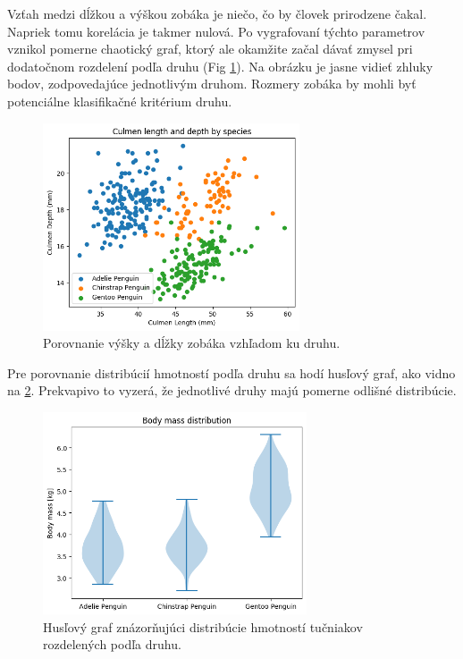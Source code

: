 \documentclass[10pt,xcolor=pdflatex,dvipsnames,table,oneside]{book}
\begin{document}
Vzťah medzi dĺžkou a výškou zobáka je niečo, čo by človek prirodzene čakal. Napriek tomu korelácia je takmer nulová.  Po vygrafovaní týchto parametrov vznikol pomerne chaotický graf, ktorý ale okamžite začal dávať zmysel pri dodatočnom rozdelení podľa druhu (Fig \ref{fig:clusters}). Na obrázku je jasne vidieť zhluky bodov, zodpovedajúce jednotlivým druhom. Rozmery zobáka by mohli byť potenciálne klasifikačné kritérium druhu.
\begin{figure}[h]
  \centering
  \includegraphics[width=7.6cm]{img/clcd.png}
  \caption{Porovnanie výšky a dĺžky zobáka vzhľadom ku druhu.}
  \label{fig:clusters}
\end{figure}
\FloatBarrier

Pre porovnanie distribúcií hmotností podľa druhu sa hodí husľový graf, ako vidno na \ref{fig:violin}. Prekvapivo to vyzerá, že jednotlivé druhy majú pomerne odlišné distribúcie.
\begin{figure}[h]
  \centering
  \includegraphics[width=7.8cm]{img/bmdist.png}
  \caption{Husľový graf znázorňujúci distribúcie hmotností tučniakov rozdelených podľa druhu.}
  \label{fig:violin}
\end{figure}
\end{document}
